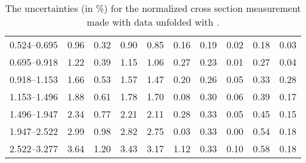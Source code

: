 \begin{table}
\begin{center}
{\begin{tabular}{@{}l l l l l l l l l l@{}}
                0.524--0.695     &  0.96   &  0.32   &  0.90         &  0.85      &  0.16    &  0.19  &  0.02       &  0.18  &  0.03  \\
                0.695--0.918     &  1.22   &  0.39   &  1.15         &  1.06      &  0.27    &  0.23  &  0.01       &  0.27  &  0.04  \\
                0.918--1.153     &  1.66   &  0.53   &  1.57         &  1.47      &  0.20    &  0.26  &  0.05       &  0.33  &  0.28  \\
                1.153--1.496     &  1.88   &  0.61   &  1.78         &  1.70      &  0.08    &  0.30  &  0.06       &  0.39  &  0.17  \\
                1.496--1.947     &  2.34   &  0.77   &  2.21         &  2.11      &  0.28    &  0.33  &  0.05       &  0.45  &  0.15  \\
                1.947--2.522     &  2.99   &  0.98   &  2.82         &  2.75      &  0.03    &  0.33  &  0.00       &  0.54  &  0.18  \\
                2.522--3.277     &  3.64   &  1.20   &  3.43         &  3.17      &  1.12    &  0.33  &  0.10       &  0.58  &  0.18  \\
                \bottomrule
            \end{tabular}
        }
    \end{center}
    \caption[
        The uncertainties for the normalized cross section measurement made
        with data unfolded with \PPsixZtwo.
    ]{
        The uncertainties (in \%) for the normalized cross section measurement
        made with data unfolded with \PPsixZtwo.
    }
    \label{tab:sys_uncert_norm_powheg}
\end{table}
